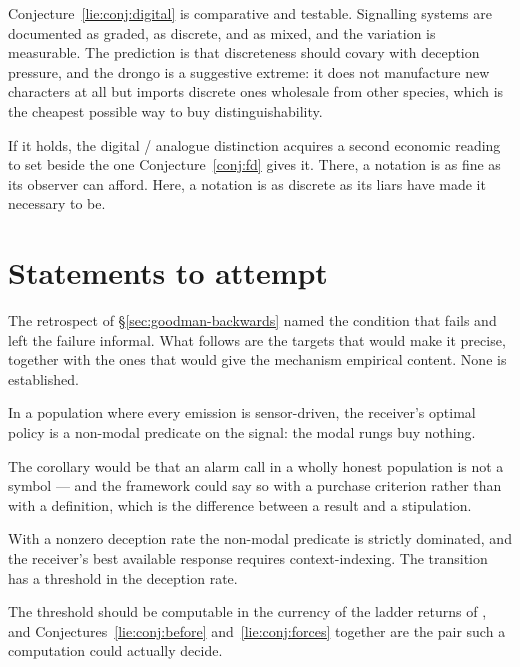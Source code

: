 Conjecture~\ref{lie:conj:digital} is comparative and testable. Signalling
systems are documented as graded, as discrete, and as mixed, and the variation is
measurable. The prediction is that discreteness should covary with deception
pressure, and the drongo is a suggestive extreme: it does not manufacture new
characters at all but imports discrete ones wholesale from other species, which
is the cheapest possible way to buy distinguishability.

If it holds, the digital / analogue distinction acquires a second economic
reading to set beside the one Conjecture~\ref{conj:fd} gives it. There, a
notation is as fine as its observer can afford. Here, a notation is as discrete
as its liars have made it necessary to be.

\section{Statements to attempt}
\label{sec:lie-props}

The retrospect of \S\ref{sec:goodman-backwards} named the condition that fails
and left the failure informal. What follows are the targets that would make it
precise, together with the ones that would give the mechanism empirical content.
None is established.

\begin{conjecture}
\label{lie:conj:before}
In a population where every emission is sensor-driven, the receiver's optimal
policy is a non-modal predicate on the signal: the modal rungs buy nothing.
\end{conjecture}

The corollary would be that an alarm call in a wholly honest population is not a
symbol --- and the framework could say so with a purchase criterion rather than
with a definition, which is the difference between a result and a stipulation.

\begin{conjecture}
\label{lie:conj:forces}
With a nonzero deception rate the non-modal predicate is strictly dominated, and
the receiver's best available response requires context-indexing. The transition
has a threshold in the deception rate.
\end{conjecture}

The threshold should be computable in the currency of the ladder returns of
\chGame, and Conjectures~\ref{lie:conj:before} and~\ref{lie:conj:forces} together
are the pair such a computation could actually decide.

